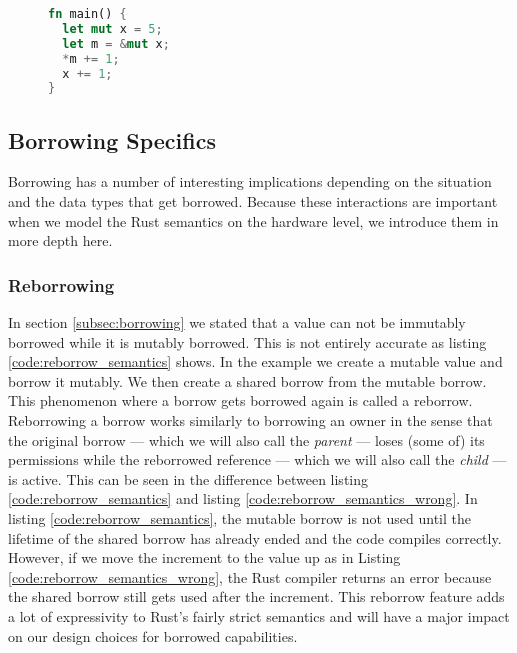 \begin{figure}[h]
\begin{lstlisting}[language=Rust,frame=single,caption=Semantic lifetimes.,label=code:semantic_lifetime]
fn main() {
  let mut x = 5;
  let m = &mut x;
  *m += 1;
  x += 1;
}
\end{lstlisting}
\end{figure}

\subsection{Borrowing Specifics}
Borrowing has a number of interesting implications depending on the situation and the data types that get borrowed.
Because these interactions are important when we model the Rust semantics on the hardware level, we introduce them in more depth here.

\subsubsection{Reborrowing}
\label{sec:backgroundreborrow}
In section \ref{subsec:borrowing} we stated that a value can not be immutably borrowed while it is mutably borrowed.
This is not entirely accurate as listing \ref{code:reborrow_semantics} shows.
In the example we create a mutable value and borrow it mutably.
We then create a shared borrow from the mutable borrow.
This phenomenon where a borrow gets borrowed again is called a reborrow.
Reborrowing a borrow works similarly to borrowing an owner in the sense that the original borrow --- which we will also call the \textit{parent} --- loses (some of) its permissions while the reborrowed reference --- which we will also call the \textit{child} --- is active.
This can be seen in the difference between listing \ref{code:reborrow_semantics} and listing \ref{code:reborrow_semantics_wrong}.
In listing \ref{code:reborrow_semantics}, the mutable borrow is not used until the lifetime of the shared borrow has already ended and the code compiles correctly.
However, if we move the increment to the value up as in Listing \ref{code:reborrow_semantics_wrong}, the Rust compiler returns an error because the shared borrow still gets used after the increment.
This reborrow feature adds a lot of expressivity to Rust's fairly strict semantics and will have a major impact on our design choices for borrowed capabilities.

